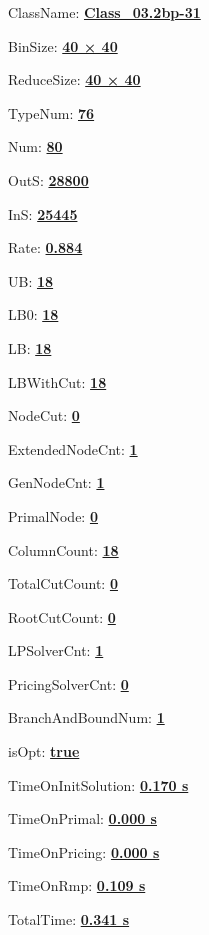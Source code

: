 \documentclass[11pt]{article}
\begin{document}
\pagestyle{empty}


ClassName: \underline{\textbf{Class_03.2bp-31}}
\par
BinSize: \underline{\textbf{40 × 40}}
\par
ReduceSize: \underline{\textbf{40 × 40}}
\par
TypeNum: \underline{\textbf{76}}
\par
Num: \underline{\textbf{80}}
\par
OutS: \underline{\textbf{28800}}
\par
InS: \underline{\textbf{25445}}
\par
Rate: \underline{\textbf{0.884}}
\par
UB: \underline{\textbf{18}}
\par
LB0: \underline{\textbf{18}}
\par
LB: \underline{\textbf{18}}
\par
LBWithCut: \underline{\textbf{18}}
\par
NodeCut: \underline{\textbf{0}}
\par
ExtendedNodeCnt: \underline{\textbf{1}}
\par
GenNodeCnt: \underline{\textbf{1}}
\par
PrimalNode: \underline{\textbf{0}}
\par
ColumnCount: \underline{\textbf{18}}
\par
TotalCutCount: \underline{\textbf{0}}
\par
RootCutCount: \underline{\textbf{0}}
\par
LPSolverCnt: \underline{\textbf{1}}
\par
PricingSolverCnt: \underline{\textbf{0}}
\par
BranchAndBoundNum: \underline{\textbf{1}}
\par
isOpt: \underline{\textbf{true}}
\par
TimeOnInitSolution: \underline{\textbf{0.170 s}}
\par
TimeOnPrimal: \underline{\textbf{0.000 s}}
\par
TimeOnPricing: \underline{\textbf{0.000 s}}
\par
TimeOnRmp: \underline{\textbf{0.109 s}}
\par
TotalTime: \underline{\textbf{0.341 s}}
\par
\newpage


\end{document}
